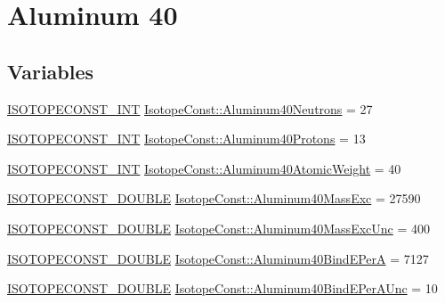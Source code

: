 \hypertarget{group___isotope_const-_aluminum-_al40}{}\section{Aluminum 40}
\label{group___isotope_const-_aluminum-_al40}
\subsection*{Variables}
\begin{DoxyCompactItemize}
\item 
\mbox{\hyperlink{group___isotope_const-_macros_ga5f18360b3e99483a35c32d789e62621c}{I\+S\+O\+T\+O\+P\+E\+C\+O\+N\+S\+T\+\_\+\+I\+NT}} \mbox{\hyperlink{group___isotope_const-_aluminum-_al40_gacdd8a59daeee21fd1b7fb4277af0d089}{Isotope\+Const\+::\+Aluminum40\+Neutrons}} = 27
\item 
\mbox{\hyperlink{group___isotope_const-_macros_ga5f18360b3e99483a35c32d789e62621c}{I\+S\+O\+T\+O\+P\+E\+C\+O\+N\+S\+T\+\_\+\+I\+NT}} \mbox{\hyperlink{group___isotope_const-_aluminum-_al40_ga75bfd045664bed8063646a14a793636e}{Isotope\+Const\+::\+Aluminum40\+Protons}} = 13
\item 
\mbox{\hyperlink{group___isotope_const-_macros_ga5f18360b3e99483a35c32d789e62621c}{I\+S\+O\+T\+O\+P\+E\+C\+O\+N\+S\+T\+\_\+\+I\+NT}} \mbox{\hyperlink{group___isotope_const-_aluminum-_al40_gac24a365b6ff85a44cf666b4a8a759599}{Isotope\+Const\+::\+Aluminum40\+Atomic\+Weight}} = 40
\item 
\mbox{\hyperlink{group___isotope_const-_macros_ga8f45a7272ce02c0b4c65c44636ed719a}{I\+S\+O\+T\+O\+P\+E\+C\+O\+N\+S\+T\+\_\+\+D\+O\+U\+B\+LE}} \mbox{\hyperlink{group___isotope_const-_aluminum-_al40_ga5e9dc6bbfe517bdc72574f8a73faa318}{Isotope\+Const\+::\+Aluminum40\+Mass\+Exc}} = 27590
\item 
\mbox{\hyperlink{group___isotope_const-_macros_ga8f45a7272ce02c0b4c65c44636ed719a}{I\+S\+O\+T\+O\+P\+E\+C\+O\+N\+S\+T\+\_\+\+D\+O\+U\+B\+LE}} \mbox{\hyperlink{group___isotope_const-_aluminum-_al40_ga01f471cac9f23213866c62f4be4379c2}{Isotope\+Const\+::\+Aluminum40\+Mass\+Exc\+Unc}} = 400
\item 
\mbox{\hyperlink{group___isotope_const-_macros_ga8f45a7272ce02c0b4c65c44636ed719a}{I\+S\+O\+T\+O\+P\+E\+C\+O\+N\+S\+T\+\_\+\+D\+O\+U\+B\+LE}} \mbox{\hyperlink{group___isotope_const-_aluminum-_al40_gad1c224a7a9f3865258701ca625fc150c}{Isotope\+Const\+::\+Aluminum40\+Bind\+E\+PerA}} = 7127
\item 
\mbox{\hyperlink{group___isotope_const-_macros_ga8f45a7272ce02c0b4c65c44636ed719a}{I\+S\+O\+T\+O\+P\+E\+C\+O\+N\+S\+T\+\_\+\+D\+O\+U\+B\+LE}} \mbox{\hyperlink{group___isotope_const-_aluminum-_al40_ga979cbe80333d8b08b200ea3bee7c79f6}{Isotope\+Const\+::\+Aluminum40\+Bind\+E\+Per\+A\+Unc}} = 10

\end{DoxyCompactItemize}

